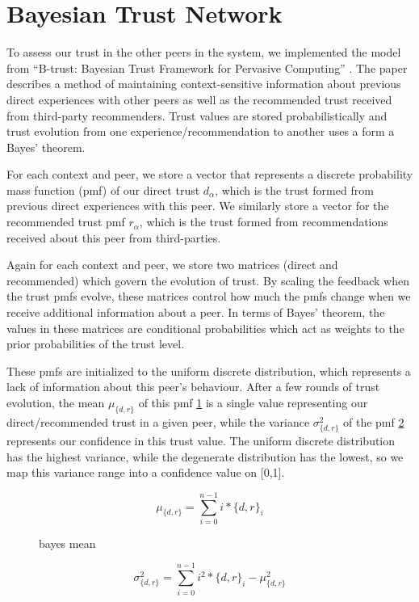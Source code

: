 \section{Bayesian Trust Network}
To assess our trust in the other peers in the system, we implemented the model
from ``B-trust: Bayesian Trust Framework for Pervasive Computing''
\cite{btrust}. The paper describes a method of maintaining context-sensitive
information about previous direct experiences with other peers as well as
the recommended trust received from third-party recommenders. Trust values
are stored probabilistically and trust evolution from one
experience/recommendation to another uses a form a Bayes' theorem.

For each context and peer, we store a vector that represents a discrete
probability mass function (pmf) of our direct trust $d_\alpha$, which is the
trust formed from previous direct experiences with this peer. We similarly store a
vector for the recommended trust pmf $r_\alpha$, which is the trust formed from
recommendations received about this peer from third-parties.

Again for each context and peer, we store two matrices (direct and recommended)
which govern the evolution of trust. By scaling the feedback when the trust
pmfs evolve, these matrices control how much the pmfs change when we receive
additional information about a peer. In terms of Bayes' theorem, the
values in these matrices are conditional probabilities which act as weights
to the prior probabilities of the trust level.

These pmfs are initialized to the uniform discrete distribution, which
represents a lack of information about this peer's behaviour. After a few rounds
of trust evolution, the mean $\mu_{\{d,r\}}$ of this pmf \ref{eqn:bayes_mean}
is a single value representing our direct/recommended trust in a given peer,
while the variance $\sigma^2_{\{d,r\}}$ of the pmf \ref{eqn:bayes_variance}
represents our confidence in this trust value. The uniform discrete distribution
has the highest variance, while the degenerate distribution has the lowest, so
we map this variance range into a confidence value on [0,1].

\begin{figure}[h]
\label{eqn:bayes_mean}
\caption{bayes mean}
\begin{equation}
\mu_{\{d,r\}} = \sum_{i=0}^{n-1}{i*{\{d,r\}}_i}
\end{equation}
\end{figure}

\begin{figure}[h]
\label{eqn:bayes_variance}
\begin{equation}
\sigma^2_{\{d,r\}} = \sum_{i=0}^{n-1}{i^2*{\{d,r\}}_i} - \mu^2_{\{d,r\}}
\end{equation}
\end{figure}
